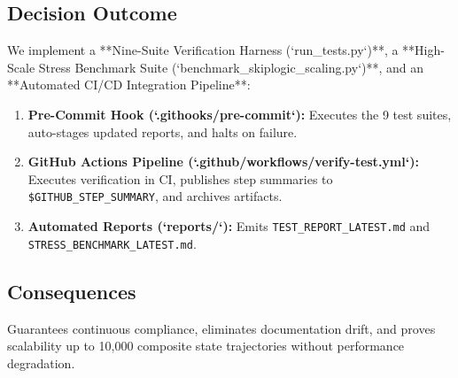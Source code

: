 \subsection{Decision Outcome}
We implement a **Nine-Suite Verification Harness (`run_tests.py`)**, a **High-Scale Stress Benchmark Suite (`benchmark_skiplogic_scaling.py`)**, and an **Automated CI/CD Integration Pipeline**:
\begin{enumerate}
    \item \textbf{Pre-Commit Hook (`.githooks/pre-commit`):} Executes the 9 test suites, auto-stages updated reports, and halts on failure.
    \item \textbf{GitHub Actions Pipeline (`.github/workflows/verify-test.yml`):} Executes verification in CI, publishes step summaries to \texttt{\$GITHUB\_STEP\_SUMMARY}, and archives artifacts.
    \item \textbf{Automated Reports (`reports/`):} Emits \texttt{TEST\_REPORT\_LATEST.md} and \texttt{STRESS\_BENCHMARK\_LATEST.md}.
\end{enumerate}

\subsection{Consequences}
Guarantees continuous compliance, eliminates documentation drift, and proves scalability up to 10,000 composite state trajectories without performance degradation.
